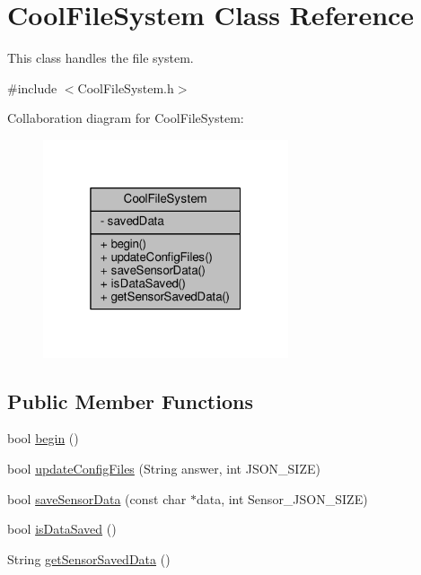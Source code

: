 \hypertarget{classCoolFileSystem}{}\section{Cool\+File\+System Class Reference}
\label{classCoolFileSystem}


This class handles the file system.  




{\ttfamily \#include $<$Cool\+File\+System.\+h$>$}



Collaboration diagram for Cool\+File\+System\+:
\nopagebreak
\begin{figure}[H]
\begin{center}
\leavevmode
\includegraphics[width=205pt]{classCoolFileSystem__coll__graph}
\end{center}
\end{figure}
\subsection*{Public Member Functions}
\begin{DoxyCompactItemize}
\item 
bool \hyperlink{classCoolFileSystem_a6ba6f666ed4c530174f8569d2c636748}{begin} ()
\item 
bool \hyperlink{classCoolFileSystem_a32dad79ae80182a83e2e8f52286b7c7b}{update\+Config\+Files} (String answer, int J\+S\+O\+N\+\_\+\+S\+I\+ZE)
\item 
bool \hyperlink{classCoolFileSystem_a4c560c2ddd40b74b7758e6ceb2c58957}{save\+Sensor\+Data} (const char $\ast$data, int Sensor\+\_\+\+J\+S\+O\+N\+\_\+\+S\+I\+ZE)
\item 
bool \hyperlink{classCoolFileSystem_a5a7eaeea7a9fbf8aaef651d862fa3b5b}{is\+Data\+Saved} ()
\item 
String \hyperlink{classCoolFileSystem_a5c58bca3735c0ed3efb268d70ef998ef}{get\+Sensor\+Saved\+Data} ()
\end{DoxyCompactItemize}
